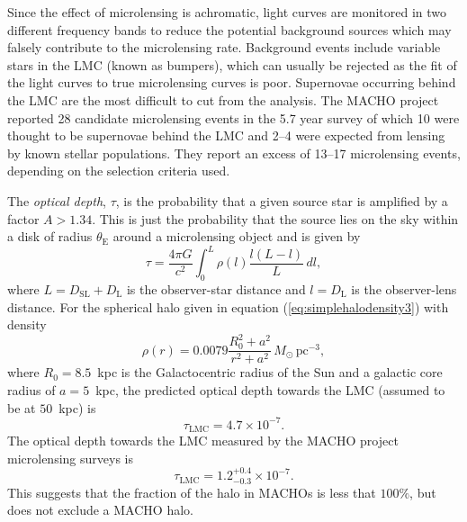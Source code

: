 Since the effect of microlensing is achromatic, light curves are monitored in
two different frequency bands to reduce the potential background sources
which may falsely contribute to the microlensing rate. Background events
include variable stars in the LMC (known as bumpers\cite{1996astro.ph..6165A}), 
which can usually be rejected as the fit of the light curves to true
microlensing curves is poor. Supernovae occurring behind the LMC are the most
difficult to cut from the analysis. The MACHO project reported 28 candidate
microlensing events in the 5.7 year survey of which 10 were thought to be
supernovae behind the LMC and 2--4 were expected from lensing by known stellar
populations.  They report an excess of 13--17 microlensing events, depending
on the selection criteria used.

The \emph{optical depth}, $\tau$, is the probability that a given source star
is amplified by a factor $A > 1.34$\cite{Paczynski:1985jf}. This is just the
probability that the source lies on the sky within a disk of radius
$\theta_\mathrm{E}$ around a microlensing object and is given
by\cite{Alcock:1995zx}
\begin{equation}
\tau = \frac{4\pi G}{c^2} \int_0^{L} \rho(l) \frac{l(L - l)}{L}\,dl,
\end{equation}
where $L = D_\mathrm{SL} + D_\mathrm{L}$ is the observer-star distance and $l
= D_\mathrm{L}$ is the observer-lens distance. For the spherical halo given in
equation (\ref{eq:simplehalodensity3}) with density
\begin{equation}
\rho(r) = 0.0079 \frac{R_0^2 + a^2}{r^2 + a^2} \,M_\odot\, \mathrm{pc}^{-3},
\end{equation}
where $R_0 = 8.5$~kpc is the Galactocentric radius of the Sun and a galactic
core radius of $a = 5$~kpc, the predicted optical depth towards the LMC
(assumed to be at $50$~kpc) is\cite{Alcock:1995zx}
\begin{equation}
\tau_\mathrm{LMC} = 4.7 \times 10^{-7}.
\end{equation}
The optical depth towards the LMC measured by the MACHO project microlensing
surveys is
\begin{equation}
\tau_\mathrm{LMC} = 1.2_{-0.3}^{+0.4} \times 10^{-7}.
\end{equation}
This suggests that the fraction of the halo in MACHOs is less that $100\%$,
but does not exclude a MACHO halo.

